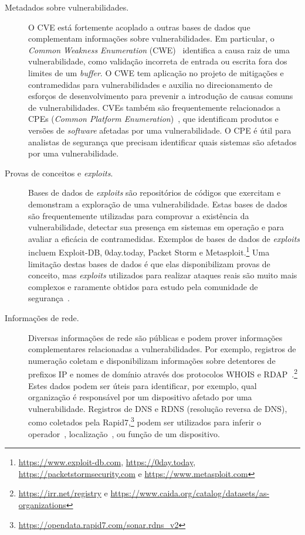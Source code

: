 \begin{description}
  \item[Metadados sobre vulnerabilidades.] O CVE está fortemente acoplado a outras bases de dados que complementam informações sobre vulnerabilidades. Em particular, o \emph{Common Weakness Enumeration} (CWE)~\cite{martin2008cwe} identifica a causa raiz de uma vulnerabilidade, como validação incorreta de entrada ou escrita fora dos limites de um \emph{buffer}. O CWE tem aplicação no projeto de mitigações e contramedidas para vulnerabilidades e auxilia no direcionamento de esforços de desenvolvimento para prevenir a introdução de causas comuns de vulnerabilidades. CVEs também são frequentemente relacionados a CPEs (\emph{Common Platform Enumeration})~\cite{cheikes2011cpe}, que identificam produtos e versões de \emph{software} afetadas por uma vulnerabilidade. O CPE é útil para analistas de segurança que precisam identificar quais sistemas são afetados por uma vulnerabilidade.

  \item[Provas de conceitos e \emph{exploits}.] Bases de dados de \emph{exploits} são repositórios de códigos que exercitam e demonstram a exploração de uma vulnerabilidade. Estas bases de dados são frequentemente utilizadas para comprovar a existência da vulnerabilidade, detectar sua presença em sistemas em operação e para avaliar a eficácia de contramedidas. Exemplos de bases de dados de \emph{exploits} incluem Exploit-DB, 0day.today, Packet Storm e Metasploit.\footnote{\url{https://www.exploit-db.com}, \url{https://0day.today}, \url{https://packetstormsecurity.com} e \url{https://www.metasploit.com}} Uma limitação destas bases de dados é que elas disponibilizam provas de conceito, mas \emph{exploits} utilizados para realizar ataques reais são muito mais complexos e raramente obtidos para estudo pela comunidade de segurança~\cite{jacobs20exploit,sabottke2015vulnerability}.

  \item[Informações de rede.] Diversas informações de rede são públicas e podem prover informações complementares relacionadas a vulnerabilidades. Por exemplo, registros de numeração coletam e disponibilizam informações sobre detentores de prefixos IP e nomes de domínio através dos protocolos WHOIS e RDAP~\cite{krenc2016bgp}.\footnote{\url{https://irr.net/registry} e \url{https://www.caida.org/catalog/datasets/as-organizations}} Estes dados podem ser úteis para identificar, por exemplo, qual organização é responsável por um dispositivo afetado por uma vulnerabilidade.
  Registros de DNS e RDNS (resolução reversa de DNS), como coletados pela Rapid7,\footnote{\url{https://opendata.rapid7.com/sonar.rdns_v2}} podem ser utilizados para inferir o operador~\cite{luckie20asnrdns}, localização~\cite{luckie21hoiho}, ou função de um dispositivo.


\end{description}
